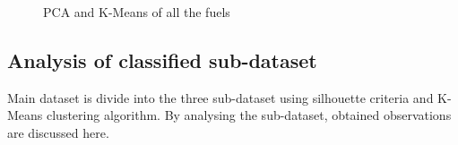 \documentclass[preprint,12pt]{elsarticle}
\begin{document}
								\begin{figure}[h]\label{fig:pca}
									\hspace{0.25cm}
									\caption{PCA and K-Means of all the fuels }
								\end{figure}
								
					\subsection{Analysis of classified sub-dataset}
					Main dataset is divide into the three sub-dataset using silhouette criteria and K-Means clustering algorithm. By analysing the sub-dataset, obtained observations are discussed here.
\end{document}
